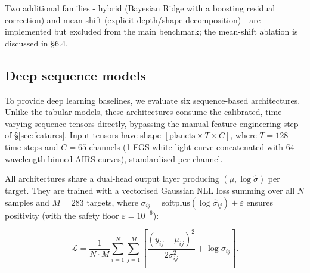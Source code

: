 \documentclass[12pt]{article}
\begin{document}
Two additional families - hybrid (Bayesian Ridge with a boosting residual correction) and mean-shift (explicit depth/shape decomposition) - are implemented but excluded from the main benchmark; the mean-shift ablation is discussed in \S{}6.4.

\subsection{Deep sequence models}

To provide deep learning baselines, we evaluate six sequence-based architectures. Unlike the tabular models, these architectures consume the calibrated, time-varying sequence tensors directly, bypassing the manual feature engineering step of \S\ref{sec:features}. Input tensors have shape $[\text{planets} \times T \times C]$, where $T = 128$ time steps and $C = 65$ channels (1 FGS white-light curve concatenated with 64 wavelength-binned AIRS curves), standardised per channel.

All architectures share a dual-head output layer producing $(\mu, \log\hat{\sigma})$ per target. They are trained with a vectorised Gaussian NLL loss summing over all $N$ samples and $M = 283$ targets, where $\sigma_{ij} = \mathrm{softplus}(\log\hat{\sigma}_{ij}) + \varepsilon$ ensures positivity (with the safety floor $\varepsilon = 10^{-6}$):

\[
\mathcal{L} = \frac{1}{N \cdot M}\sum_{i=1}^N \sum_{j=1}^M \left[\frac{(y_{ij} - \mu_{ij})^2}{2\sigma_{ij}^2} + \log\sigma_{ij}\right].
\]
\end{document}
